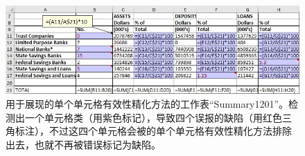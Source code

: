 \begin{figure}[tbp]
    \centering
    \includegraphics[width=\columnwidth]{figure/figure2.png}
    \caption{用于展现\wa 的单个单元格有效性精化方法的工作表``Summary1201''。\cu 检测出一个单元格类（用紫色标记），导致四个误报的缺陷（用红色三角标注），不过这四个单元格会被\wa 的单个单元格有效性精化方法排除出去，也就不再被错误标记为缺陷。}
    \label{figure2}
\end{figure}